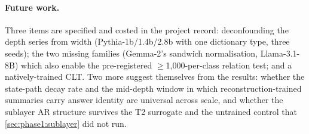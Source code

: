 \paragraph{Future work.}
Three items are specified and costed in the project record: deconfounding the
depth series from width (Pythia-1b/1.4b/2.8b with one dictionary type, three
seeds); the two missing families (Gemma-2's sandwich normalisation,
Llama-3.1-8B) which also enable the pre-registered $\ge$1{,}000-per-class
relation test; and a natively-trained CLT. Two more suggest themselves from
the results: whether the state-path decay rate and the mid-depth window in
which reconstruction-trained summaries carry answer identity are universal
across scale, and whether the sublayer
AR structure survives the T2 surrogate and the untrained control that
\cref{sec:phase1:sublayer} did not run.
